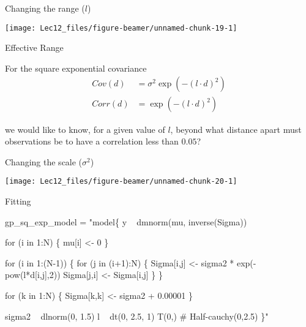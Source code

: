 \documentclass[11pt,ignorenonframetext,]{beamer}
\newenvironment{Shaded}{}{}
\newcommand{\NormalTok}[1]{#1}
\newcommand{\StringTok}[1]{\textcolor[rgb]{0.25,0.44,0.63}{#1}}
\let\oldShaded\Shaded
\let\endoldShaded\endShaded
\renewenvironment{Shaded}{\footnotesize\begin{spacing}{0.9}\oldShaded}{\endoldShaded\end{spacing}}
\begin{document}
\begin{frame}{Changing the range (\(l\))}
\protect\hypertarget{changing-the-range-l}{}

\begin{center}\texttt{[image: Lec12\_files/figure-beamer/unnamed-chunk-19-1]} \end{center}

\end{frame}

\begin{frame}[t]{Effective Range}
\protect\hypertarget{effective-range}{}

For the square exponential covariance \[ \begin{aligned} 
Cov(d) &= \sigma^2 \exp\left(-(l \cdot d)^2\right) \\
Corr(d) &= \exp\left(-(l \cdot d)^2\right)
\end{aligned} \]

we would like to know, for a given value of \(l\), beyond what distance
apart must observations be to have a correlation less than \(0.05\)?

\end{frame}

\begin{frame}{Changing the scale (\(\sigma^2\))}
\protect\hypertarget{changing-the-scale-sigma2}{}

\begin{center}\texttt{[image: Lec12\_files/figure-beamer/unnamed-chunk-20-1]} \end{center}

\end{frame}

\begin{frame}[fragile]{Fitting}
\protect\hypertarget{fitting}{}

\begin{Shaded}
\begin{Highlighting}[]
\NormalTok{gp_sq_exp_model =}\StringTok{ "model\{}
\StringTok{  y ~ dmnorm(mu, inverse(Sigma))}

\StringTok{  for (i in 1:N) \{}
\StringTok{    mu[i] <- 0}
\StringTok{  \}}

\StringTok{  for (i in 1:(N-1)) \{}
\StringTok{    for (j in (i+1):N) \{}
\StringTok{      Sigma[i,j] <- sigma2 * exp(- pow(l*d[i,j],2))}
\StringTok{      Sigma[j,i] <- Sigma[i,j]}
\StringTok{    \}}
\StringTok{  \}}

\StringTok{  for (k in 1:N) \{}
\StringTok{    Sigma[k,k] <- sigma2 + 0.00001}
\StringTok{  \}}

\StringTok{  sigma2   ~ dlnorm(0, 1.5)}
\StringTok{  l        ~ dt(0, 2.5, 1) T(0,) # Half-cauchy(0,2.5)}
\StringTok{\}"}
\end{Highlighting}
\end{Shaded}

\end{frame}
\end{document}
